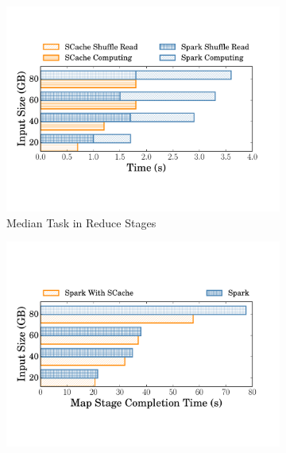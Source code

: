 \begin{figure}
\begin{minipage}[t]{.32\linewidth}
\begin{subfigure}{\linewidth}
			\begin{minipage}{\linewidth}
				\includegraphics[width=\linewidth]{fig/groupbyreducetask}
				\caption{Median Task in Reduce Stages}
				\label{fig:reducetask}
			\end{minipage}
		\end{subfigure}
		\caption{Median Task Completion Time of Single Shuffle Test}
		\label{fig:singleshuffletask}
	\end{minipage}	
	\begin{minipage}[t]{.32\linewidth}
		\begin{subfigure}{\linewidth}
			\begin{minipage}{\linewidth}
				\includegraphics[width=\linewidth]{fig/groupbymapstage}

\end{minipage}
\end{subfigure}
\end{minipage}
\end{figure}
